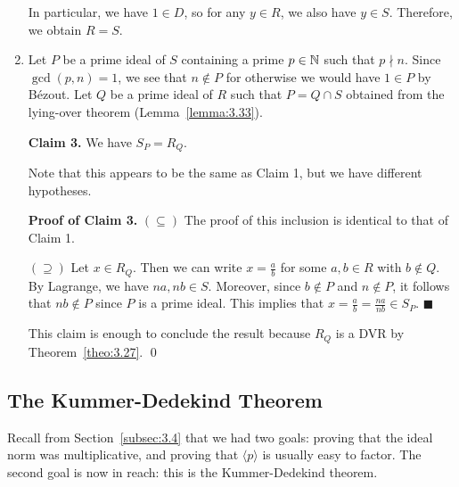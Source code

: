 \begin{pf}
\begin{enumerate}[(1)]
        In particular, we have $1 \in D$, so for any $y \in R$, we also have $y \in S$. 
        Therefore, we obtain $R = S$. 

        \item Let $P$ be a prime ideal of $S$ containing a prime $p \in \mathbb{N}$ such that 
        $p \nmid n$. Since $\gcd(p, n) = 1$, we see that $n \notin P$ for 
        otherwise we would have $1 \in P$ by B\'ezout. Let $Q$ be a prime ideal of 
        $R$ such that $P = Q \cap S$ obtained from the lying-over theorem 
        (Lemma~\ref{lemma:3.33}). 

        {\bf Claim 3.} We have $S_P = R_Q$. 

        Note that this appears to be the same as Claim 1, but we have different hypotheses. 

        {\bf Proof of Claim 3.} $(\subseteq)$ The proof of this inclusion is identical to
        that of Claim 1.

        $(\supseteq)$ Let $x \in R_Q$. Then we can write $x = \frac{a}{b}$ for some 
        $a, b \in R$ with $b \notin Q$. By Lagrange, we have $na, nb \in S$. 
        Moreover, since $b \notin P$ and $n \notin P$, it follows that $nb \notin P$ 
        since $P$ is a prime ideal. This implies that $x = \frac{a}{b} = 
        \frac{na}{nb} \in S_P$. \hfill $\blacksquare$ 

        This claim is enough to conclude the result because $R_Q$ 
        is a DVR by Theorem~\ref{theo:3.27}. \qed 
    \end{enumerate}
\end{pf}

\subsection{The Kummer-Dedekind Theorem} \label{subsec:3.9}
Recall from Section~\ref{subsec:3.4} that we had two goals: proving that the ideal 
norm was multiplicative, and proving that $\langle p \rangle$ is usually easy 
to factor. The second goal is now in reach: this is the Kummer-Dedekind theorem. 

